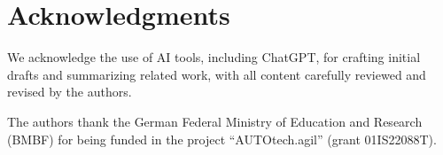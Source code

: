 \section{Acknowledgments}

We acknowledge the use of AI tools, including ChatGPT,
for crafting initial drafts and summarizing related work,
with all content carefully reviewed and revised by the authors.

The authors thank the German Federal Ministry of Education and Research (BMBF)
for being funded in the project \enquote{AUTOtech.agil} (grant 01IS22088T).

